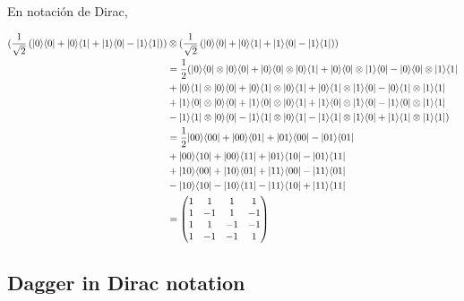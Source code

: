 \documentclass[osajnl,preprint,showpacs,superscriptaddress,10pt]{revtex4-1} %
\DeclarePairedDelimiter\bra{\langle}{\rvert}
\DeclarePairedDelimiter\ket{\lvert}{\rangle}
\begin{document}
\begin{itemize}
    En notación de Dirac,
    \begin{fleqn}[\parindent]
    \begin{equation}
    \begin{split}
        (\frac{1}{\sqrt{2}} \left (\ket{0}\bra{0} + \ket{0}\bra{1} + \ket{1}\bra{0} -\ket{1}\bra{1} \right)) 
        &\tens (\frac{1}{\sqrt{2}} \left (\ket{0}\bra{0} + \ket{0}\bra{1} + \ket{1}\bra{0} -\ket{1}\bra{1} \right)) \\
        &= \frac{1}{2} (\ket{0} \bra{0} \tens \ket{0} \bra{0} + \ket{0} \bra{0} \tens \ket{0} \bra{1} + \ket{0} \bra{0} \tens \ket{1} \bra{0} - \ket{0} \bra{0} \tens \ket{1} \bra{1} \\
        &+ \ket{0} \bra{1} \tens \ket{0} \bra{0} + \ket{0} \bra{1} \tens \ket{0} \bra{1} + \ket{0} \bra{1} \tens \ket{1} \bra{0} - \ket{0} \bra{1} \tens \ket{1} \bra{1} \\
        &+ \ket{1} \bra{0} \tens \ket{0} \bra{0} + \ket{1} \bra{0} \tens \ket{0} \bra{1} + \ket{1} \bra{0} \tens \ket{1} \bra{0} - \ket{1} \bra{0} \tens \ket{1} \bra{1} \\
        &- \ket{1} \bra{1} \tens \ket{0} \bra{0} - \ket{1} \bra{1} \tens \ket{0} \bra{1} - \ket{1} \bra{1} \tens \ket{1} \bra{0} + \ket{1} \bra{1} \tens \ket{1} \bra{1}) \\
        &= \frac{1}{2} \ket{00} \bra{00} + \ket{00} \bra{01} + \ket{01} \bra{00} - \ket{01} \bra{01} \\
        &+ \ket{00} \bra{10} + \ket{00} \bra{11} + \ket{01} \bra{10} - \ket{01} \bra{11} \\
        &+ \ket{10} \bra{00} + \ket{10} \bra{01} + \ket{11} \bra{00} - \ket{11} \bra{01} \\
        &- \ket{10} \bra{10} - \ket{10} \bra{11} - \ket{11} \bra{10} + \ket{11} \bra{11} \\
        &= \begin{pmatrix}
            1 & 1 & 1 & 1 \\
            1 & -1 & 1 & -1 \\
            1 & 1 & -1 & -1 \\
            1 & -1 & -1 & 1
        \end{pmatrix}
    \end{split}
    \end{equation}
    \end{fleqn}

\end{itemize}

\subsection{Dagger in Dirac notation}
\end{document}
